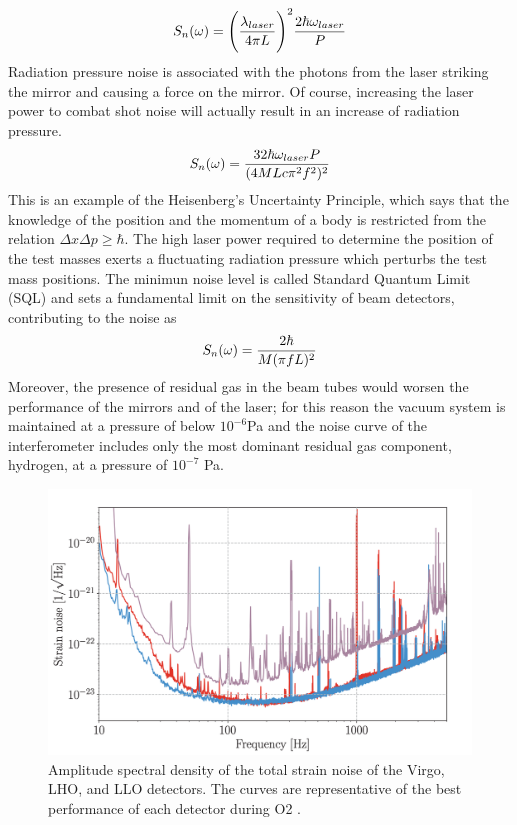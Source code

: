\documentclass[binding=0.6cm, LaM]{sapthesis}
\begin{document}
		\begin{equation}
                	S_n(\omega) = \Bigg({{\lambda_{laser}} \over {4 \pi L}}\Bigg)^2 {{2 \hbar \omega_{laser}} \over {P}}
                \end{equation}
        Radiation pressure noise is associated with the photons from the laser striking the mirror
        and causing a force on the mirror. Of course, increasing the laser power to combat shot noise
        will actually result in an increase of radiation pressure.
                \begin{equation}
                	S_n(\omega) =  {{32 \hbar \omega_{laser}P} \over {(4MLc \pi^2 f^2)^2}}
                \end{equation}
        This is an example of the Heisenberg’s Uncertainty Principle, which says that the knowledge
        of the position and the momentum of a body is restricted from the relation $\Delta x \Delta p \geq \hbar$. 
        The high laser power required to determine the position of the test masses exerts
        a fluctuating radiation pressure which perturbs the test mass positions. 
        The minimun noise level is called Standard Quantum Limit (SQL) and sets a fundamental limit
        on the sensitivity of beam detectors, contributing to the noise as
                \begin{equation}
                	S_n(\omega) = {{2 \hbar} \over {M(\pi f L)^2}}
                \end{equation}
        Moreover, the presence of residual gas in the beam tubes would worsen the performance
        of the mirrors and of the laser; for this reason the vacuum system is maintained at a pressure
        of below $10^{-6}$Pa and the noise curve of the interferometer includes only
        the most dominant residual gas component, hydrogen, at a pressure of $10^{−7}$ Pa. 
		\begin{figure}[H]
                	\includegraphics[scale=0.6]{noise1}
                	\centering
                	\caption{Amplitude spectral density of the total strain noise 
				 of the Virgo, LHO, and LLO detectors. 
				 The curves are representative of the best 
				 performance of each detector during O2 \cite{13}.}
                	\label{fig:noise1}
                \end{figure}
\end{document}

